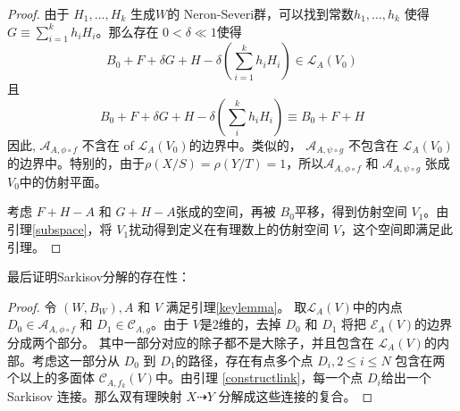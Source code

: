 \begin{proof}
  由于 $H_{1},\ldots ,H_{k}$ 生成$W$的 Neron-Severi群，可以找到常数$h_{1},\ldots ,h_{k}$ 使得 $G \equiv \sum^{k}_{i=1} h_{i}H_{i}$。那么存在 $0< \delta\ll 1$使得 
  \[B_{0}+F+\delta G+H- \delta(\sum_{i=1}^{k} h_{i}H_{i}) \in \mathcal{L}_{A}(V_{0})\]
  且
  \[ B_{0}+F+\delta G+H-\delta (\sum_i^k h_{i}H_{i}) \equiv B_{0}+F+H \]
  因此, $\mathcal{A}_{A,\phi\circ f}$ 不含在 of $\mathcal{L}_{A}(V_{0})$的边界中。类似的， $\mathcal{A}_{A,\psi\circ g}$ 不包含在 $\mathcal{L}_{A}(V_{0})$的边界中。特别的，由于$\rho(X/S)=\rho(Y/T)=1$，所以$\mathcal{A}_{A,\phi\circ f}$ 和   $\mathcal{A}_{A,\psi\circ g}$ 张成 $V_{0}$中的仿射平面。

  考虑 $F+H-A$ 和 $G+H-A$张成的空间，再被 $B_{0}$平移，得到仿射空间 $V_{1}$。由引理\ref{subspace}，将 $V_{1}$扰动得到定义在有理数上的仿射空间 $V$，这个空间即满足此引理。
\end{proof}

最后证明Sarkisov分解的存在性：
\begin{proof}
  令 $(W,B_{W}),A $ 和 $V$ 满足引理\ref{keylemma}。 取$ \mathcal{L}_A(V) $中的内点$ D_{0} \in \mathcal{A}_{A,\phi\circ f} $  和 $ D_1\in \mathcal{C}_{A,g} $。由于 $ V $是2维的，去掉 $ D_0 $ 和 $ D_1 $ 将把 $ \mathcal{E}_A(V) $的边界分成两个部分。
  其中一部分对应的除子都不是大除子，并且包含在 $ \mathcal{L}_A(V) $的内部。考虑这一部分从 $ D_0 $ 到 $ D_1 $的路径，存在有点多个点 $ D_i , 2\leqslant i\leqslant N $ 包含在两个以上的多面体 $ \mathcal{C}_{A,f_{k}}(V) $中。由引理 \ref{constructlink}，每一个点 $ D_i $给出一个 Sarkisov 连接。那么双有理映射 $X \dashrightarrow Y$ 分解成这些连接的复合。
\end{proof}
